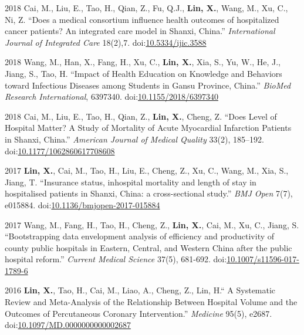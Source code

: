 \documentclass[12pt,letterpaper]{report}
\begin{document}
\begin{tablist}
    	 \item[2018] \tab Cai, M., Liu, E., Tao, H., Qian, Z., Fu, Q.J., \textbf{Lin, X.}, Wang, M., Xu, C., Ni, Z. \enquote{Does a medical consortium influence health outcomes of hospitalized cancer patients? An integrated care model in Shanxi, China.} \textit{International Journal of Integrated Care}  18(2),7. doi:\href{https://doi.org/10.5334/ijic.3588}{10.5334/ijic.3588}
    	 
		\item[2018] \tab Wang, M., Han, X., Fang, H., Xu, C., \textbf{Lin, X.}, Xia, S., Yu, W., He, J., Jiang, S., Tao, H. \enquote{Impact of Health Education on Knowledge and Behaviors toward Infectious Diseases among Students in Gansu Province, China.} \textit{BioMed Research International}, 6397340. doi:\href{https://doi.org/10.1155/2018/6397340}{10.1155/2018/6397340}
		
		\item[2018] \tab Cai, M., Liu, E., Tao, H., Qian, Z., \textbf{Lin, X.}, Cheng, Z. \enquote{Does Level of Hospital Matter? A Study of Mortality of Acute Myocardial Infarction Patients in Shanxi, China.} \textit{American Journal of Medical Quality}  33(2), 185–192. doi:\href{https://doi.org/10.1177/1062860617708608}{10.1177/1062860617708608}
		
		\item[2017] \tab  \textbf{Lin, X.}, Cai, M., Tao, H., Liu, E., Cheng, Z., Xu, C., Wang, M., Xia, S., Jiang, T. \enquote{Insurance status, inhospital mortality and length of stay in hospitalised patients in Shanxi, China: a cross-sectional study.} \textit{BMJ Open}  7(7), e015884. doi:\href{https://doi.org/10.1136/bmjopen-2017-015884}{10.1136/bmjopen-2017-015884}
		   
		\item[2017] \tab Wang, M., Fang, H., Tao, H., Cheng, Z., \textbf{Lin, X.}, Cai, M., Xu, C., Jiang, S. \enquote{Bootstrapping data envelopment analysis of efficiency and productivity of county public hospitals in Eastern, Central, and Western China after the public hospital reform.} \textit{Current Medical Science}  37(5), 681-692. doi:\href{https://doi.org/10.1007/s11596-017-1789-6}{10.1007/s11596-017-1789-6}
    	 
		\item[2016] \tab \textbf{Lin, X.}, Tao, H., Cai, M., Liao, A., Cheng, Z., Lin, H.\enquote{ A Systematic Review and Meta-Analysis of the Relationship Between Hospital Volume and the Outcomes of Percutaneous Coronary Intervention.} \textit{Medicine}  95(5), e2687. doi:\href{https://doi.org/10.1097/MD.0000000000002687}{10.1097/MD.0000000000002687}
				

\end{tablist}
\end{document}
